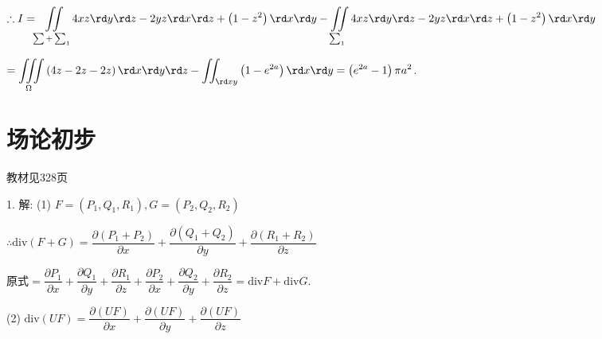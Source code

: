   $\therefore I=\displaystyle\iint\limits _{\sum +\sum_1}{4xz\rd y\rd z-2yz\rd x\rd z+\left( 1-{{z}^{2}} \right)\rd x\rd y-\iint\limits _{\sum_1}{4xz\rd y\rd z-2yz\rd x\rd z+\left( 1-{{z}^{2}} \right)\rd x\rd y}}$

  $=\displaystyle\iiint\limits _{\Omega }{\left( 4z-2z-2z \right)\rd x\rd y\rd z}-\iint _{\rd xy}{\left( 1-{{e}^{2a}} \right)\rd x\rd y=\left( {{e}^{2a}}-1 \right)\pi {{a}^{2}}}$.

\section{场论初步}
\begin{flushright}
  \color{zhanqing!80}
   教材见328页
\end{flushright}

  1. 解: (1) $F=\left( {{P}_{1}},{{Q}_{1}},{{R}_{1}} \right),G=\left( {{P}_{2}},{{Q}_{2}},{{R}_{2}} \right)$

  $\therefore \text{div}  \left( F+G \right)=\dfrac{\partial \left( {{P}_{1}}+{{P}_{2}} \right)}{\partial x}+\dfrac{\partial \left( {{Q}_{1}}+{{Q}_{2}} \right)}{\partial y}+\dfrac{\partial \left( {{R}_{1}}+{{R}_{2}} \right)}{\partial z}$

  原式$=\dfrac{\partial {{P}_{1}}}{\partial x}+\dfrac{\partial {{Q}_{1}}}{\partial y}+\dfrac{\partial {{R}_{1}}}{\partial z}+\dfrac{\partial {{P}_{2}}}{\partial x}+\dfrac{\partial {{Q}_{2}}}{\partial y}+\dfrac{\partial {{R}_{2}}}{\partial z}=\text{div}  F+\text{div}  G$.

  (2) $\text{div}  \left( UF \right)=\dfrac{\partial \left( UF \right)}{\partial x}+\dfrac{\partial \left( UF \right)}{\partial y}+\dfrac{\partial \left( UF \right)}{\partial z}$

